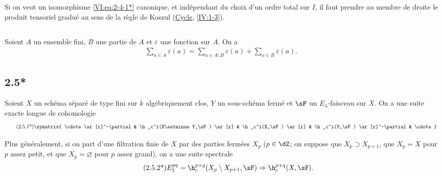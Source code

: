 Si on veut un isomorphisme \eqref{VI:eq:2-4-1*} canonique, et indépendant du 
choix d'un ordre total sur $I$, il faut prendre au membre de droite le produit 
tensoriel gradué au sens de la règle de Koszul 
(\hyperref[IV]{Cycle}, \ref{IV:1-3}). 





\subsection{}\label{VI:2-5}

Soient $A$ un ensemble fini, $B$ une partie de $A$ et $\varepsilon$ une 
fonction sur $A$. On a 
\begin{align*}\tag{2.5.1}\label{VI:2-5-1}
  \sum_{a\in A} \varepsilon(a) = \sum_{a\in A\setminus B}\varepsilon(a) + \sum_{a\in B} \varepsilon(a) \text{.}
\end{align*}





\subsection*{2.5*}\label{VI:2-5*}

Soient $X$ un schéma séparé de type fini sur $k$ algébriquement clos, 
$Y$ un sous-schéma fermé et $\sF$ un $E_\lambda$-faisceau sur $X$. On a 
une suite exacte longue de cohomologie 
\begin{align*}\tag{2.5.1*}\label{VI:eq:2-5-1*}
\xymatrix{
  \cdots \ar[r]^-\partial 
    & \h_c^i(X\setminus Y,\sF) \ar[r] 
    & \h_c^i(X,\sF) \ar[r] 
    & \h_c^i(Y,\sF) \ar[r]^-\partial 
    & \cdots 
}
\end{align*}

Plus généralement, si on part d'une filtration finie de $X$ par des parties 
fermées $X_p$ ($p\in \dZ$; on suppose que $X_p\supset X_{p+1}$, que $X_p=X$ 
pour $p$ assez petit, et que $X_p=\varnothing$ pour $p$ assez grand), on a une 
suite spectrale 
\begin{align*}\tag{2.5.2*}\label{VI:eq:2-5-2*}
  E_1^{p q} = \h_c^{p+q}(X_p\setminus X_{p+1},\sF) \Rightarrow \h_c^{p+q}(X,\sF) \text{.}
\end{align*}





\subsection{}\label{VI:2-6}

